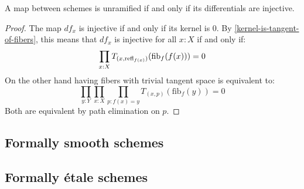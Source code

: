 \begin{proposition}
A map between schemes is unramified if and only if its differentials are injective. 
\end{proposition}
\begin{proof}
The map $df_x$ is injective if and only if its kernel is $0$. By \cref{kernel-is-tangent-of-fibers}, this means that $df_x$ is injective for all $x:X$ if and only if:
\[
\prod_{x:X}T_{(x,\mathrm{refl}_{f(x)})}(\mathrm{fib}_f(f(x)))=0
\]
On the other hand having fibers with trivial tangent space is equivalent to:
\[
\prod_{y:Y}\prod_{x:X}\prod_{p:f(x)=y} T_{(x,p)}(\mathrm{fib}_f(y)) = 0
\]
Both are equivalent by path elimination on $p$.
\end{proof}


\subsection{Formally smooth schemes}




\subsection{Formally étale schemes}



